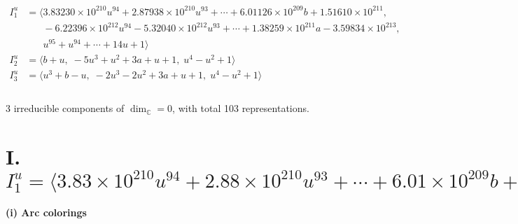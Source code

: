 \documentclass[1p]{elsarticle_modified}
\theoremstyle{definition}
\begin{document}
\begin{align*}
I^u_{1}&=\langle 
3.83230\times10^{210} u^{94}+2.87938\times10^{210} u^{93}+\cdots+6.01126\times10^{209} b+1.51610\times10^{211},\\
\phantom{I^u_{1}}&\phantom{= \langle  }-6.22396\times10^{212} u^{94}-5.32040\times10^{212} u^{93}+\cdots+1.38259\times10^{211} a-3.59834\times10^{213},\\
\phantom{I^u_{1}}&\phantom{= \langle  }u^{95}+u^{94}+\cdots+14 u+1\rangle \\
I^u_{2}&=\langle 
b+u,\;-5 u^3+u^2+3 a+u+1,\;u^4- u^2+1\rangle \\
I^u_{3}&=\langle 
u^3+b- u,\;-2 u^3-2 u^2+3 a+u+1,\;u^4- u^2+1\rangle \\
\\
\end{align*}
\raggedright * 3 irreducible components of $\dim_{\mathbb{C}}=0$, with total 103 representations.\\
\newpage
\renewcommand{\arraystretch}{1}
\centering \section*{I. $I^u_{1}= \langle 3.83\times10^{210} u^{94}+2.88\times10^{210} u^{93}+\cdots+6.01\times10^{209} b+1.52\times10^{211},\;-6.22\times10^{212} u^{94}-5.32\times10^{212} u^{93}+\cdots+1.38\times10^{211} a-3.60\times10^{213},\;u^{95}+u^{94}+\cdots+14 u+1 \rangle$}
\flushleft \textbf{(i) Arc colorings}\\
\end{document}
